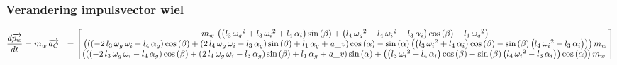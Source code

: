 \subsubsection{Verandering impulsvector wiel}
\begin{equation*}
\begin{split}
\frac{d\overrightarrow{{p}_{w}}}{dt}
&=m_{w}\,\overrightarrow{{a}_{C}}
&=	  \begin{bmatrix}
      m_{w}\, \left(  \left( l_{3}\,{\omega_{g}}^{
2}+l_{3}\,{\omega_{i}}^{2}+l_{4}\,\alpha_{i} \right) \sin \left( \beta
 \right) + \left( l_{4}\,{\omega_{g}}^{2}+l_{4}\,{\omega_{i}}^{2}-l_{3
}\,\alpha_{i} \right) \cos \left( \beta \right) -l_{1}\,{\omega_{g}}^{
2} \right) \\ 
%
 \left(  \left(  \left( -2\,l_{3}\,
\omega_{g}\,\omega_{i}-l_{4}\,\alpha_{g} \right) \cos \left( \beta
 \right) + \left( 2\,l_{4}\,\omega_{g}\,\omega_{i}-l_{3}\,\alpha_{g}
 \right) \sin \left( \beta \right) +l_{1}\,\alpha_{g}+{\it a\_v}
 \right) \cos \left( \alpha \right) -\sin \left( \alpha \right) 
 \left(  \left( l_{3}\,{\omega_{i}}^{2}+l_{4}\,\alpha_{i} \right) \cos
 \left( \beta \right) -\sin \left( \beta \right)  \left( l_{4}\,{
\omega_{i}}^{2}-l_{3}\,\alpha_{i} \right)  \right)  \right) m_{w}
\\ 
%
 \left(  \left(  \left( -2\,l_{3}\,\omega_{g}\,
\omega_{i}-l_{4}\,\alpha_{g} \right) \cos \left( \beta \right) +
 \left( 2\,l_{4}\,\omega_{g}\,\omega_{i}-l_{3}\,\alpha_{g} \right) 
\sin \left( \beta \right) +l_{1}\,\alpha_{g}+{\it a\_v} \right) \sin
 \left( \alpha \right) + \left(  \left( l_{3}\,{\omega_{i}}^{2}+l_{4}
\,\alpha_{i} \right) \cos \left( \beta \right) -\sin \left( \beta
 \right)  \left( l_{4}\,{\omega_{i}}^{2}-l_{3}\,\alpha_{i} \right) 
 \right) \cos \left( \alpha \right)  \right) m_{w}\
      \end{bmatrix}
\end{split}
\end{equation*}